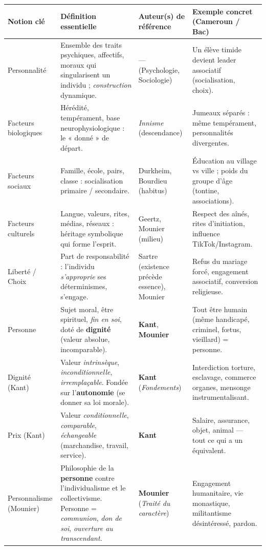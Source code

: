 \documentclass[11pt]{article}
\newcommand{\cle}[1]{{\popxbold\color{popdark}#1}}
\begin{document}
\begin{popfigure}
\centering
\begin{tabularx}{\linewidth}{|l|X|X|X|}\hline
\rowcolor{popblueL}
\textbf{Notion clé} & \textbf{Définition essentielle} & \textbf{Auteur(s) de référence} & \textbf{Exemple concret (Cameroun / Bac)} \\ \hline
\cle{Personnalité} & Ensemble des traits psychiques, affectifs, moraux qui singularisent un individu ; \emph{construction} dynamique. & — (Psychologie, Sociologie) & Un élève timide devient leader associatif (socialisation, choix). \\ \hline
\cle{Facteurs biologiques} & Hérédité, tempérament, base neurophysiologique : le « donné » de départ. & \emph{Innisme} (descendance) & Jumeaux séparés : même tempérament, personnalités divergentes. \\ \hline
\cle{Facteurs sociaux} & Famille, école, pairs, classe : socialisation primaire / secondaire. & Durkheim, Bourdieu (habitus) & Éducation au village vs ville ; poids du groupe d'âge (tontine, associations). \\ \hline
\cle{Facteurs culturels} & Langue, valeurs, rites, médias, réseaux : héritage symbolique qui forme l'esprit. & Geertz, Mounier (milieu) & Respect des aînés, rites d'initiation, influence TikTok/Instagram. \\ \hline
\cle{Liberté / Choix} & Part de responsabilité : l'individu \emph{s'approprie} ses déterminismes, s'engage. & Sartre (existence précède essence), Mounier & Refus du mariage forcé, engagement associatif, conversion religieuse. \\ \hline
\cle{Personne} & Sujet moral, être spirituel, \emph{fin en soi}, doté de \textbf{dignité} (valeur absolue, incomparable). & \textbf{Kant}, \textbf{Mounier} & Tout être humain (même handicapé, criminel, fœtus, vieillard) = personne. \\ \hline
\cle{Dignité (Kant)} & Valeur \emph{intrinsèque}, \emph{inconditionnelle}, \emph{irremplaçable}. Fondée sur l'\textbf{autonomie} (se donner sa loi morale). & \textbf{Kant} (\emph{Fondements}) & Interdiction torture, esclavage, commerce organes, mensonge instrumentalisant. \\ \hline
\cle{Prix (Kant)} & Valeur \emph{conditionnelle}, \emph{comparable}, \emph{échangeable} (marchandise, travail, service). & \textbf{Kant} & Salaire, assurance, objet, animal — tout ce qui a un équivalent. \\ \hline
\cle{Personnalisme (Mounier)} & Philosophie de la \textbf{personne} contre l'individualisme et le collectivisme. Personne = \emph{communion}, \emph{don de soi}, \emph{ouverture au transcendant}. & \textbf{Mounier} (\emph{Traité du caractère}) & Engagement humanitaire, vie monastique, militantisme désintéressé, pardon. \\ \hline

\end{tabularx}
\end{popfigure}
\end{document}
